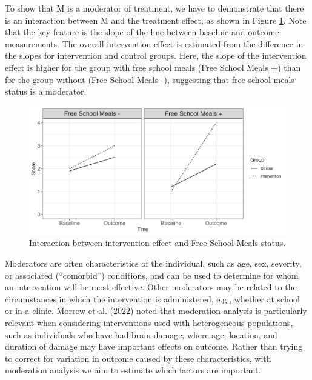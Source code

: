 \documentclass{krantz}
\begin{document}
To show that M is a moderator of treatment, we have to demonstrate that there is an interaction between M and the treatment effect, as shown in Figure \ref{fig:modfig}. Note that the key feature is the slope of the line between baseline and outcome measurements. The overall intervention effect is estimated from the difference in the slopes for intervention and control groups. Here, the slope of the intervention effect is higher for the group with free school meals (Free School Meals +) than for the group without (Free School Meals -), suggesting that free school meals status is a moderator.

\begin{center}
\begin{figure}
\includegraphics[width=0.95\linewidth]{images_bw/Moderator} \caption{Interaction between intervention effect and Free School Meals status.}\label{fig:modfig}
\end{figure}
\end{center}

Moderators are often characteristics of the individual, such as age, sex, severity, or associated (``comorbid'') conditions, and can be used to determine for whom an intervention will be most effective. Other moderators may be related to the circumstances in which the intervention is administered, e.g., whether at school or in a clinic. Morrow et al. (\protect\hyperlink{ref-morrow2022}{2022}) noted that moderation analysis is particularly relevant when considering interventions used with heterogeneous populations, such as individuals who have had brain damage, where age, location, and duration of damage may have important effects on outcome. Rather than trying to correct for variation in outcome caused by these characteristics, with moderation analysis we aim to estimate which factors are important.
\end{document}
